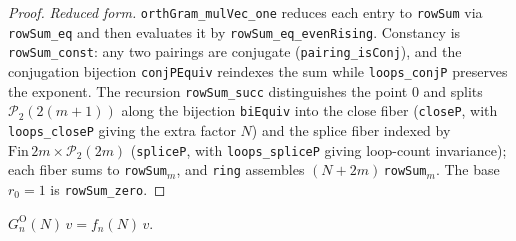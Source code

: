 \begin{proof}
\medskip
\noindent\emph{Reduced form.} \texttt{orthGram\_mulVec\_one} reduces each
entry to \texttt{rowSum} via \texttt{rowSum\_eq} and then evaluates it by
\texttt{rowSum\_eq\_evenRising}. Constancy is \texttt{rowSum\_const}: any two
pairings are conjugate (\texttt{pairing\_isConj}), and the conjugation
bijection \texttt{conjPEquiv} reindexes the sum while \texttt{loops\_conjP}
preserves the exponent. The recursion \texttt{rowSum\_succ} distinguishes the
point $0$ and splits $\mathcal P_2(2(m+1))$ along the bijection
\texttt{biEquiv} into the close fiber (\texttt{closeP}, with
\texttt{loops\_closeP} giving the extra factor $N$) and the splice fiber
indexed by $\mathrm{Fin}\,2m\times\mathcal P_2(2m)$ (\texttt{spliceP}, with
\texttt{loops\_spliceP} giving loop-count invariance); each fiber sums to
\texttt{rowSum}$_m$, and \texttt{ring} assembles $(N+2m)\,$\texttt{rowSum}$_m$.
The base $r_0=1$ is \texttt{rowSum\_zero}.
\end{proof}

\begin{theorem}\label{thm:orth_det_absorb}
\leanok
{}
$G^{\mathrm O}_n(N)\,v = f_n(N)\,v$.
\end{theorem}

